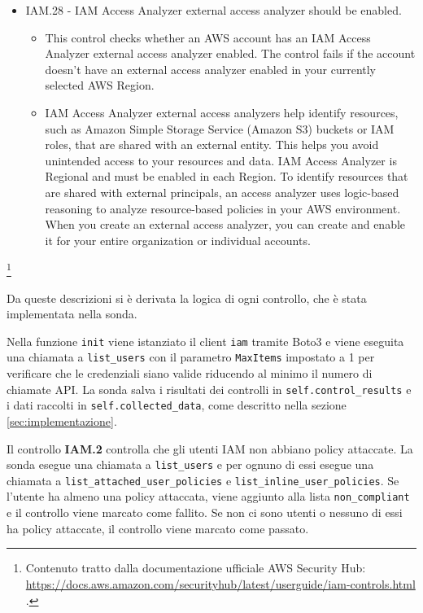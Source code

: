 \begin{mdframed}[backgroundcolor=gray!05, linecolor=gray!50]
\begin{itemize}
\begin{itemize}
    \end{itemize}
    \item IAM.28 - IAM Access Analyzer external access analyzer should be enabled.
    \begin{itemize}
        \item This control checks whether an AWS account has an IAM Access Analyzer external access analyzer enabled. The control fails if the account doesn't have an external access analyzer enabled in your currently selected AWS Region.
        \item IAM Access Analyzer external access analyzers help identify resources, such as Amazon Simple Storage Service (Amazon S3) buckets or IAM roles, that are shared with an external entity. This helps you avoid unintended access to your resources and data. IAM Access Analyzer is Regional and must be enabled in each Region. To identify resources that are shared with external principals, an access analyzer uses logic-based reasoning to analyze resource-based policies in your AWS environment. When you create an external access analyzer, you can create and enable it for your entire organization or individual accounts.
    \end{itemize}
\end{itemize}
\end{mdframed}
\footnote{Contenuto tratto dalla documentazione ufficiale AWS Security Hub: \url{https://docs.aws.amazon.com/securityhub/latest/userguide/iam-controls.html} .}

Da queste descrizioni si è derivata la logica di ogni controllo, che è stata implementata nella sonda. 

Nella funzione \texttt{init} viene istanziato il client \texttt{iam} tramite Boto3 e viene eseguita una chiamata a \texttt{list\_users} con il parametro \texttt{MaxItems} impostato a 1 per verificare che le credenziali siano valide riducendo al minimo il numero di chiamate API. La sonda salva i risultati dei controlli in \texttt{self.control\_results} e i dati raccolti in \texttt{self.collected\_data}, come descritto nella sezione \ref{sec:implementazione}.

Il controllo \textbf{IAM.2} controlla che gli utenti IAM non abbiano policy attaccate. La sonda esegue una chiamata a \texttt{list\_users} e per ognuno di essi esegue una chiamata a \texttt{list\_attached\_user\_policies} e \texttt{list\_inline\_user\_policies}. Se l'utente ha almeno una policy attaccata, viene aggiunto alla lista \texttt{non\_compliant} e il controllo viene marcato come fallito. Se non ci sono utenti o nessuno di essi ha policy attaccate, il controllo viene marcato come passato.


